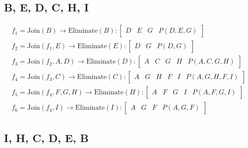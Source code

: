 \documentclass[en]{university}
\begin{document}
\subsection{B, E, D, C, H, I}

\begin{align*}
    f_1 = \text{Join} (B) \rightarrow \text{Eliminate} (B) : \begin{bmatrix}
        D & E & G & P(D, E, G)
    \end{bmatrix} \\
    f_2 = \text{Join} (f_1, E) \rightarrow \text{Eliminate} (E) : \begin{bmatrix}
        D & G & P(D, G)
    \end{bmatrix} \\
    f_3 = \text{Join} (f_2, A, D) \rightarrow \text{Eliminate} (D) : \begin{bmatrix}
        A & C & G & H & P(A, C, G, H)
    \end{bmatrix} \\
    f_4 = \text{Join} (f_3, C) \rightarrow \text{Eliminate} (C) : \begin{bmatrix}
        A & G & H & F & I & P(A, G, H, F, I)
    \end{bmatrix} \\
    f_5 = \text{Join} (f_4, F, G, H) \rightarrow \text{Eliminate} (H) : \begin{bmatrix}
        A & F & G & I & P(A, F, G, I)
    \end{bmatrix} \\
    f_6 = \text{Join} (f_4, I) \rightarrow \text{Eliminate} (I) : \begin{bmatrix}
        A & G & F & P(A, G, F)
    \end{bmatrix}
\end{align*}

\subsection{I, H, C, D, E, B}
\end{document}
